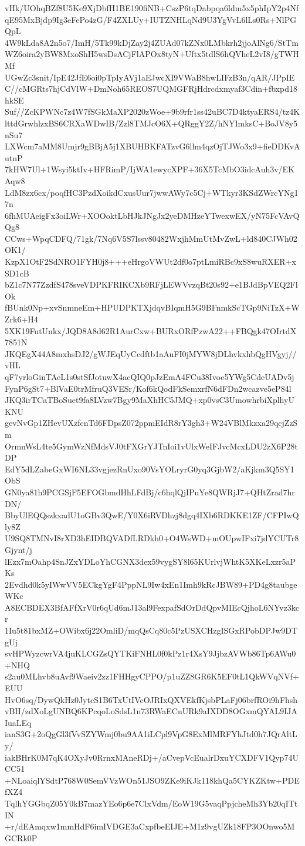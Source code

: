 vHk/UOhqBZf8U5Ke9XjDbfH1BE190fiNB+CszP6tqDabpqa6ldm5x5phIpY2p4Nf
qE95MxBjdp9Ig3eFePo4zG/F4ZXLUy+IUTZNHLqNd9U3YgVvL6lLs0Rs+NlPGQpL
4W9kLda8A2n5o7/ImH/5Tk99kDjZay2j4ZUAd07kZNx0LMbkrh2jjoAlNg6/StTm
WZ6oira2yBW8MxoShH5wsDsACjFlAPOx8tyN+Uftx5tdlS6hQVheL2vI8/gTWHMf
UGwZc3snit/IpE42JfE6oi0pTpIyAVj1aEJwcXI9VWaB8hwLIFzB3n/qAR/JPpIE
C//cMGRts7hjCdVlW+DmNoh65REOS7UQMGFRjHdrcdxmyaf3Cdin+fbxpd18hkSE
Suf//ZcKPWNc7z4W7fSGkMaXP2020zWoe+9b9rfr1ss42uBC7D4ktyaERS4/tz4K
lttdGrwhlzxBS6CRXaWDwIB/Zzl8TMJcO6X+QRggY2Z/hNYImksC+BoJV8y5nSu7
LXWcm7aMM8Umjr9gBBjA5j1XBUHBKFATzvG6llm4qzOjTJWo3x9+fieDDKvAutnP
7kHW7Ul+1Wsyi5ktIv+HFRimP/IjWA1ewycXPF+36X5TcMbO3idcAuh3v/EKAqw8
LdM8zx6cx/poqfHC3PzdXoikdCxusUur7jwwAWy7c5Cj+WTkyr3KSdZWrcYNg17n
6fhMUAeigFx3oiLWr+XOOoktLbHJkJNgJx2yeDMHzeYTwexwEX/yN75FcVAvQQg8
CCws+WpqCDFQ/71gk/7Nq6V5S7lssv80482WxjhMmUtMvZwL+ld840CJWh02OK1/
KzpX1OtF2SdNRO1FYH0j8+++eHrgoVWUt2df0o7ptLmiRBc9xS8wuRXER+xSD1cB
bZ1c7N77ZzdfS478sveVDPKFRIKCXb9RFjLEWVvzqBt20s92+e1BJdBpVEQ2FlOk
fBUnk0Np+xvSnmneEm+HPUDPKTXjdqvBIqmH5G9BFnmkScTGp9NiTzX+WZrk6+H4
5XK19FutUnkx/JQD8A8d62R1AurCxw+BURxORfPzwA22++FBQgk47OIrtdX7851N
JKQEgX44A8mxhsDJ2/gWJEqUyCcdftb1aAuFI0jMYW8jDLhvkxhbQgHVgyj//vHL
qF7yrloGinTAeL1s0stSfJotuwX4acQIQ0pJzEmA4FCu38Ivoe5YWg5CdeUADv5j
FynP6gSt7+BlVaE0trMfruQ3VESr/Kof6kQodFkSemxrfN6dFDn2wcazve5eP84l
JKQ3irTCaTBoSuet9fa8LVzw7Bgy9MaXhHC5JMQ+xp0vsC3UmowhrbiXplhyUKNU
gevNvGp1ZHevUXzfcnTd6FDpsZ072ppmEIdR8rY3gh3+W24VBlMkzxa29qcjZzSm
OrmnWsL4te5GymWzNfMdsVJ0tFXGrYJTnIoi1vUlxWeIFJvcMcxLDU2zX6P28tDP
EdY5dLZabeGxWI6NL33vgjezRnUxo90VsYOLryrG0yq3GjbW2/aKjkm3Q5SY1ObS
GN0ya81h9PCGSjF5EFOGbmdHhLFdBj/c6hqlQjIPuYe8QWRjJ7+QHtZrad7hrDN/
BbyUlEQQszkxadU1oGBv3QwE/Y0X6iRVDhzj8dgq4IXb6RDKKE1ZF/CFPIwQly8Z
U9SQ8TMNvI8rXD3hEIDBQVADfLRDkh0+O4WsWD+mOUpwIFxi7jdYCUTr8Gjynt/j
lEzx7mOahp4SnJZxYDLoYhCGNX3dex59vygSY8l65KUrlvjWhtK5XKeLxzr5aPKs
2Evdhd0k5yIWwVV5ECkgYgF4PppNL9Iw4xEn1Imh9kRcJBW89+PD4g8taubgeWKc
A8ECBDEX3BfAFfXrV0r6qUd6mJ13al9FexpafSdOrDdQpvMIEcQjhoL6NYvz3kcr
1Iu5t81bxMZ+OWibx6j22OmliD/mqQsCq80c5PzUSXCHzgISGxRPobDPJw9DTgUj
svHPWyzcwrVA4juKLCGZsQYTKiFNHL0f0kPz1r4XsY9JjbzAVWb86Tp6AWu0+NHQ
s2au0MLhvb8uAvf9Waeiv2zz1FHHgyCPPO/p1uZZ8GR6K5EF0tL1QkWVqNVf+EUU
HvO6sq/DywQkHz0JytcS1B6TxUtIVcOJRIxQXVEkfKjsbPLaFj06brfROi9hFhsh
vBH/zdXoLgUNBQ6KPcqoLoSdsL1n73RWaECnURk9aIXDD8OGxmQYAL9IJAIuaLEq
ianS3G+2oQgGl3fVvSZYWmj0bu9AA1iLCpl9VpG8ExMlMRFYhJtd0h7JQrAltLy/
iakBHrK0M7qK4OXyJv0RrnxMAneRDj+/aCvepVcEualrDxuYCXDFV1Qyp74UCC51
+NLoaiqlYSdtP768W0SemVVzWOn51JSO9ZKe9iKJk118khQa5CYKZKtw+PDEfXZ4
TqlhYGGbqZ05Y0kB7mazYEo6p6e7ClxVdm/EoW19G5vaqPpjcheMh3Yb20qITtIN
+r/dEAmqxw1mmHdF6imIVDGE3aCxpfbeEIJE+M1z9vgUZk18FP3OOnwo5MGCRk0P
